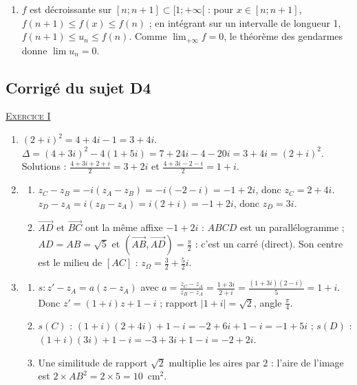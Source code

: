 \begin{corrige}
\begin{enumerate}
\begin{enumerate}
      \item $f \geq 0$, donc l'aire vaut $F(1) - F(0) = -\frac{10}{\expo{}} + 5 = 5 - \frac{10}{\expo{}}$ unit\'es d'aire, soit
            $\boxed{4\left(5 - \frac{10}{\expo{}}\right) = 20 - \frac{40}{\expo{}} \approx 5{,}28 \text{ cm}^2}$.
      \end{enumerate}
\item $f$ est d\'ecroissante sur $[n ; n+1] \subset [1 ; +\infty[$ : pour $x \in [n ; n+1]$, $f(n+1) \leq f(x) \leq f(n)$ ; en int\'egrant
      sur un intervalle de longueur 1, $f(n+1) \leq u_n \leq f(n)$. Comme $\lim_{+\infty} f = 0$, le th\'eor\`eme des gendarmes donne $\lim u_n = 0$.
\end{enumerate}

\subsection{Corrig\'e du sujet D4}
\noindent \underline{\textsc{Exercice I}}
\begin{enumerate}
\item $(2 + i)^2 = 4 + 4i - 1 = 3 + 4i$. $\Delta = (4 + 3i)^2 - 4(1 + 5i) = 7 + 24i - 4 - 20i = 3 + 4i = (2+i)^2$.
      Solutions : $\frac{4 + 3i + 2 + i}{2} = 3 + 2i$ et $\frac{4 + 3i - 2 - i}{2} = 1 + i$.
\item \begin{enumerate}
      \item $z_C - z_B = -i(z_A - z_B) = -i(-2 - i) = -1 + 2i$, donc $z_C = 2 + 4i$.
            $z_D - z_A = i(z_B - z_A) = i(2 + i) = -1 + 2i$, donc $z_D = 3i$.
      \item $\overrightarrow{AD}$ et $\overrightarrow{BC}$ ont la m\^eme affixe $-1 + 2i$ : $ABCD$ est un parall\'elogramme ;
            $AD = AB = \sqrt{5}$ et $(\overrightarrow{AB}, \overrightarrow{AD}) = \frac{\pi}{2}$ : c'est un carr\'e (direct).
            Son centre est le milieu de $[AC]$ : $z_\Omega = \frac{3}{2} + \frac{5}{2}i$.
      \end{enumerate}
\item \begin{enumerate}
      \item $s : z' - z_A = a(z - z_A)$ avec $a = \frac{z_C - z_A}{z_B - z_A} = \frac{1 + 3i}{2 + i} = \frac{(1 + 3i)(2 - i)}{5} = 1 + i$.
            Donc $z' = (1 + i)z + 1 - i$ ; rapport $|1 + i| = \sqrt{2}$, angle $\frac{\pi}{4}$.
      \item $s(C)$ : $(1+i)(2 + 4i) + 1 - i = -2 + 6i + 1 - i = -1 + 5i$ ; $s(D)$ : $(1 + i)(3i) + 1 - i = -3 + 3i + 1 - i = -2 + 2i$.
      \item Une similitude de rapport $\sqrt{2}$ multiplie les aires par $2$ : l'aire de l'image est $2 \times AB^2 = 2 \times 5 = 10$~cm$^2$.
      \end{enumerate}
\end{enumerate}


\end{corrige}
